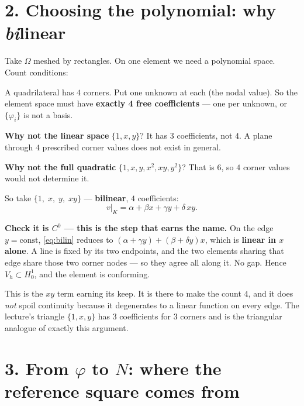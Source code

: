 \documentclass[11pt]{article}
\begin{document}
\section*{2. Choosing the polynomial: why \emph{bi}linear}

Take $\Omega$ meshed by rectangles. On one element we need a polynomial space.
Count conditions:

\begin{steps}
\item A quadrilateral has $4$ corners. Put one unknown at each (the nodal
      value). So the element space must have \textbf{exactly 4 free
      coefficients} --- one per unknown, or $\{\varphi_{i}\}$ is not a basis.
\item \textbf{Why not the linear space} $\{1,x,y\}$? It has $3$ coefficients,
      not $4$. A plane through $4$ prescribed corner values does not exist in
      general.
\item \textbf{Why not the full quadratic} $\{1,x,y,x^{2},xy,y^{2}\}$? That is
      $6$, so $4$ corner values would not determine it.
\item So take $\{1,\;x,\;y,\;xy\}$ --- \textbf{bilinear}, $4$ coefficients:
\begin{equation}\label{eq:bilin}
  v\big|_{K}=\alpha+\beta x+\gamma y+\delta\,xy .
\end{equation}
\end{steps}

\medskip
\textbf{Check it is $C^{0}$ --- this is the step that earns the name.}
On the edge $y=\text{const}$, \eqref{eq:bilin} reduces to
$(\alpha+\gamma y)+(\beta+\delta y)x$, which is \textbf{linear in $x$ alone}.
A line is fixed by its two endpoints, and the two elements sharing that edge
share those two corner nodes --- so they agree all along it. No gap.
Hence $V_{h}\subset H^{1}_{0}$, and the element is conforming.

\medskip
{\small\color{black!60}This is the $xy$ term earning its keep. It is there to
make the count $4$, and it does \emph{not} spoil continuity because it degenerates
to a linear function on every edge. The lecture's triangle
$\{1,x,y\}$ has $3$ coefficients for $3$ corners and is the triangular analogue
of exactly this argument.}

\section*{3. From $\varphi$ to $N$: where the reference square comes from}
\end{document}
